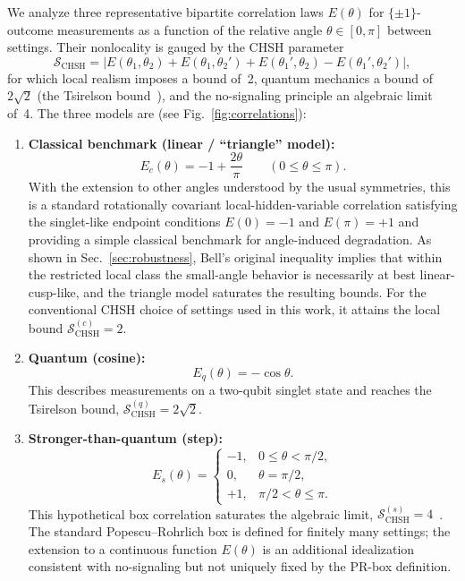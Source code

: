 \documentclass[pra,twocolumn,showpacs,preprintnumbers,amsmath,amssymb,longbibliography,
               superscriptaddress]{revtex4-2}
\begin{document}
We analyze three representative bipartite correlation laws $E(\theta)$
for $\{\pm1\}$-outcome measurements as a function of the relative
angle $\theta \in [0, \pi]$ between settings.
Their nonlocality is gauged by the {CHSH}
parameter{~\cite{chsh,bell}}
\begin{equation}
\mathcal{S}_{\mathrm{CHSH}}
  {= |E(\theta_1,\theta_2) + E(\theta_1,\theta_2')
    + E(\theta_1',\theta_2) - E(\theta_1',\theta_2')|,}
\end{equation}
for which local realism imposes a bound of~2, quantum mechanics a
bound of $2\sqrt{2}$ (the Tsirelson
bound~\cite{cirelson:80}), and the no-signaling principle an algebraic
limit of~4.
The three models are (see Fig.~\ref{fig:correlations}):
\begin{enumerate}
  \item \textbf{Classical {benchmark} (linear {/ ``triangle'' model}):}
  \[
    E_c(\theta) = -1 + {\frac{2\theta}{\pi}\qquad (0\le \theta \le \pi).}
  \]
  {With the extension to other angles understood by the usual symmetries,
  this is a standard rotationally covariant local-hidden-variable
  correlation satisfying the singlet-like endpoint conditions
  $E(0)=-1$ and $E(\pi)=+1$ and providing a simple classical benchmark
  for angle-induced degradation.
  As shown in Sec.~\ref{sec:robustness}, Bell's original inequality
  implies that within the restricted local class the small-angle
  behavior is necessarily at best linear-cusp-like, and the triangle
  model saturates the resulting bounds.
  For the conventional CHSH choice of settings used in this work, it
  attains the local bound $\mathcal{S}_{\mathrm{CHSH}}^{(c)}=2$.}

  \item \textbf{Quantum (cosine):}
      \[
      E_q(\theta) = -\cos\theta.
      \]
      This describes measurements on a two-qubit singlet state and
      reaches the Tsirelson bound,
      $\mathcal{S}_{\mathrm{CHSH}}^{(q)} = 2\sqrt{2}$.

  \item \textbf{Stronger-than-quantum (step):}
      {\[
      E_s(\theta)=
      \begin{cases}
      -1, & 0\le \theta<\pi/2,\\
      0,  & \theta=\pi/2,\\
      +1, & \pi/2<\theta\le \pi.
      \end{cases}
      \]}
      This hypothetical box correlation saturates the algebraic
      limit,
      $\mathcal{S}_{\mathrm{CHSH}}^{(s)} = 4$~\cite{pop-rohr,%
      svozil-krenn}.
      {The standard Popescu--Rohrlich box is defined for finitely many
      settings; the extension to a continuous function $E(\theta)$ is an
      additional idealization consistent with no-signaling but not
      uniquely fixed by the PR-box definition.}
\end{enumerate}
\end{document}
